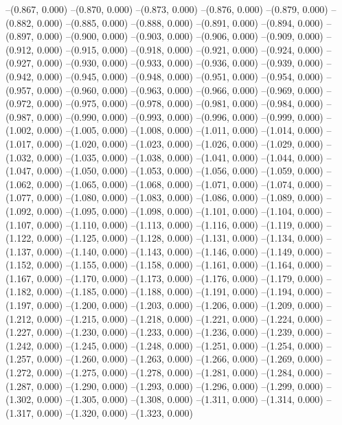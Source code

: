 {--(0.867, 0.000)
--(0.870, 0.000)
--(0.873, 0.000)
--(0.876, 0.000)
--(0.879, 0.000)
--(0.882, 0.000)
--(0.885, 0.000)
--(0.888, 0.000)
--(0.891, 0.000)
--(0.894, 0.000)
--(0.897, 0.000)
--(0.900, 0.000)
--(0.903, 0.000)
--(0.906, 0.000)
--(0.909, 0.000)
--(0.912, 0.000)
--(0.915, 0.000)
--(0.918, 0.000)
--(0.921, 0.000)
--(0.924, 0.000)
--(0.927, 0.000)
--(0.930, 0.000)
--(0.933, 0.000)
--(0.936, 0.000)
--(0.939, 0.000)
--(0.942, 0.000)
--(0.945, 0.000)
--(0.948, 0.000)
--(0.951, 0.000)
--(0.954, 0.000)
--(0.957, 0.000)
--(0.960, 0.000)
--(0.963, 0.000)
--(0.966, 0.000)
--(0.969, 0.000)
--(0.972, 0.000)
--(0.975, 0.000)
--(0.978, 0.000)
--(0.981, 0.000)
--(0.984, 0.000)
--(0.987, 0.000)
--(0.990, 0.000)
--(0.993, 0.000)
--(0.996, 0.000)
--(0.999, 0.000)
--(1.002, 0.000)
--(1.005, 0.000)
--(1.008, 0.000)
--(1.011, 0.000)
--(1.014, 0.000)
--(1.017, 0.000)
--(1.020, 0.000)
--(1.023, 0.000)
--(1.026, 0.000)
--(1.029, 0.000)
--(1.032, 0.000)
--(1.035, 0.000)
--(1.038, 0.000)
--(1.041, 0.000)
--(1.044, 0.000)
--(1.047, 0.000)
--(1.050, 0.000)
--(1.053, 0.000)
--(1.056, 0.000)
--(1.059, 0.000)
--(1.062, 0.000)
--(1.065, 0.000)
--(1.068, 0.000)
--(1.071, 0.000)
--(1.074, 0.000)
--(1.077, 0.000)
--(1.080, 0.000)
--(1.083, 0.000)
--(1.086, 0.000)
--(1.089, 0.000)
--(1.092, 0.000)
--(1.095, 0.000)
--(1.098, 0.000)
--(1.101, 0.000)
--(1.104, 0.000)
--(1.107, 0.000)
--(1.110, 0.000)
--(1.113, 0.000)
--(1.116, 0.000)
--(1.119, 0.000)
--(1.122, 0.000)
--(1.125, 0.000)
--(1.128, 0.000)
--(1.131, 0.000)
--(1.134, 0.000)
--(1.137, 0.000)
--(1.140, 0.000)
--(1.143, 0.000)
--(1.146, 0.000)
--(1.149, 0.000)
--(1.152, 0.000)
--(1.155, 0.000)
--(1.158, 0.000)
--(1.161, 0.000)
--(1.164, 0.000)
--(1.167, 0.000)
--(1.170, 0.000)
--(1.173, 0.000)
--(1.176, 0.000)
--(1.179, 0.000)
--(1.182, 0.000)
--(1.185, 0.000)
--(1.188, 0.000)
--(1.191, 0.000)
--(1.194, 0.000)
--(1.197, 0.000)
--(1.200, 0.000)
--(1.203, 0.000)
--(1.206, 0.000)
--(1.209, 0.000)
--(1.212, 0.000)
--(1.215, 0.000)
--(1.218, 0.000)
--(1.221, 0.000)
--(1.224, 0.000)
--(1.227, 0.000)
--(1.230, 0.000)
--(1.233, 0.000)
--(1.236, 0.000)
--(1.239, 0.000)
--(1.242, 0.000)
--(1.245, 0.000)
--(1.248, 0.000)
--(1.251, 0.000)
--(1.254, 0.000)
--(1.257, 0.000)
--(1.260, 0.000)
--(1.263, 0.000)
--(1.266, 0.000)
--(1.269, 0.000)
--(1.272, 0.000)
--(1.275, 0.000)
--(1.278, 0.000)
--(1.281, 0.000)
--(1.284, 0.000)
--(1.287, 0.000)
--(1.290, 0.000)
--(1.293, 0.000)
--(1.296, 0.000)
--(1.299, 0.000)
--(1.302, 0.000)
--(1.305, 0.000)
--(1.308, 0.000)
--(1.311, 0.000)
--(1.314, 0.000)
--(1.317, 0.000)
--(1.320, 0.000)
--(1.323, 0.000)
}
